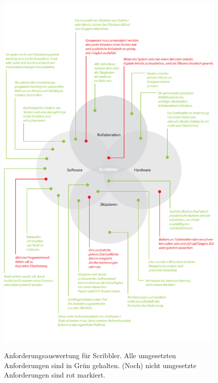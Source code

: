 \begin{figure}
	        {\includegraphics[bb=0cm 0cm 14.39cm 23.01cm]{gfx/scribblerAnforderungsauswertung}}
		\caption[Anforderungsauswertung für Scribbler]{Anforderungsauswertung für Scribbler. Alle umgesetzten Anforderungen sind in Grün gehalten. (Noch) nicht umgesetzte Anforderungen sind rot markiert.}\label{fig:scribblerAnforderungsauswertung}
\end{figure}


